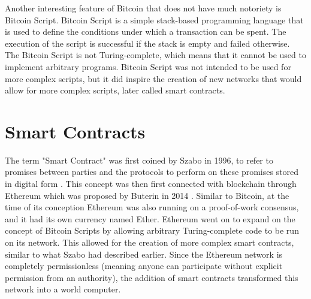 Another interesting feature of Bitcoin that does not have much notoriety is Bitcoin Script. Bitcoin Script is a simple stack-based programming language that is used to define the conditions under which a transaction can be spent. The execution of the script is successful if the stack is empty and failed otherwise. The Bitcoin Script is not Turing-complete, which means that it cannot be used to implement arbitrary programs. Bitcoin Script was not intended to be used for more complex scripts, but it did inspire the creation of new networks that would allow for more complex scripts, later called smart contracts.

\section{Smart Contracts}
The term "Smart Contract" was first coined by Szabo in 1996, to refer to promises between parties and the protocols to perform on these promises stored in digital form \cite{szabo_smart_1996}. This concept was then first connected with blockchain through Ethereum which was proposed by Buterin in 2014 \cite{buterin_ethereum_2014}. Similar to Bitcoin, at the time of its conception Ethereum was also running on a proof-of-work consensus, and it had its own currency named Ether. Ethereum went on to expand on the concept of Bitcoin Scripts by allowing arbitrary Turing-complete code to be run on its network. This allowed for the creation of more complex smart contracts, similar to what Szabo had described earlier. Since the Ethereum network is completely permissionless (meaning anyone can participate without explicit permission from an authority), the addition of smart contracts transformed this network into a world computer.

